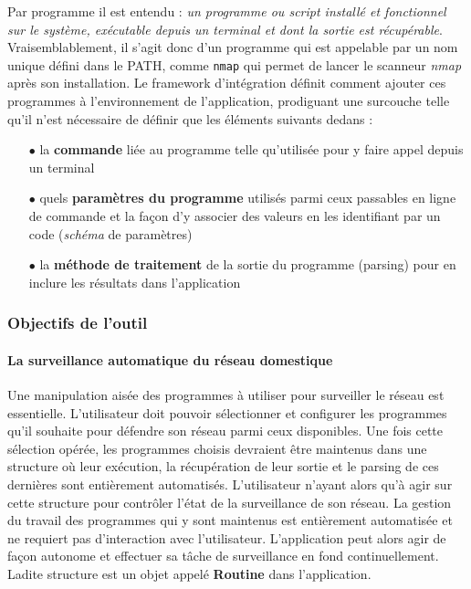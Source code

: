 \documentclass[]{article}
\begin{document}
\par Par programme il est entendu : \textit{un programme ou script installé et fonctionnel sur le système, exécutable depuis un terminal et dont la sortie est récupérable}. Vraisemblablement, il s'agit donc d'un programme qui est appelable par un nom unique défini dans le PATH, comme \texttt{nmap} qui permet de lancer le scanneur \textit{nmap} après son installation. Le framework d'intégration définit comment ajouter ces programmes à l'environnement de l'application, prodiguant une surcouche telle qu'il n'est nécessaire de définir que les éléments suivants dedans :\\
\begin{itemize}
\item[$\bullet$] la \textbf{commande} liée au programme telle qu'utilisée pour y faire appel depuis un terminal
\vspace{0.2cm}
\item[$\bullet$] quels \textbf{paramètres du programme} utilisés parmi ceux passables en ligne de commande et la façon d'y associer des valeurs en les identifiant par un code (\textit{schéma} de paramètres)
\vspace{0.2cm}
\item[$\bullet$] la \textbf{méthode de traitement} de la sortie du programme (parsing) pour en inclure les résultats dans l'application
\end{itemize}


\newpage

\subsubsection{Objectifs de l'outil}\label{appgoals}

\paragraph{La surveillance automatique du réseau domestique}

Une manipulation aisée des programmes à utiliser pour surveiller le réseau est essentielle. L'utilisateur doit pouvoir sélectionner et configurer les programmes qu'il souhaite pour défendre son réseau parmi ceux disponibles. Une fois cette sélection opérée, les programmes choisis devraient être maintenus dans une structure où leur exécution, la récupération de leur sortie et le parsing de ces dernières sont entièrement automatisés. L'utilisateur n'ayant alors qu'à agir sur cette structure pour contrôler l'état de la surveillance de son réseau. La gestion du travail des programmes qui y sont maintenus est entièrement automatisée et ne requiert pas d'interaction avec l'utilisateur. L'application peut alors agir de façon autonome et effectuer sa tâche de surveillance en fond continuellement. Ladite structure est un objet appelé \textbf{Routine} dans l'application.
\end{document}
